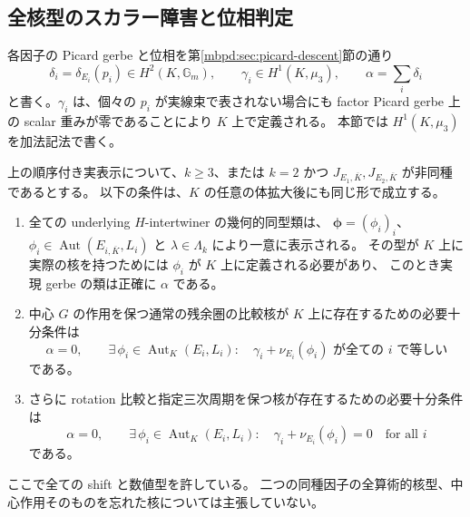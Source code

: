 \subsection{全核型のスカラー障害と位相判定}

各因子の Picard gerbe と位相を第\ref{mbpd:sec:picard-descent}節の通り
\[
 \delta_i=\delta_{E_i}(p_i)\in H^2(K,\mathbb G_m),\qquad
 \gamma_i\in H^1(K,\mu_3),\qquad
 \alpha=\sum_i\delta_i
\]
と書く。$\gamma_i$ は、個々の $p_i$ が実線束で表されない場合にも
factor Picard gerbe 上の scalar 重みが零であることにより $K$ 上で定義される。
本節では $H^1(K,\mu_3)$ を加法記法で書く。

\begin{theorem}[因子分離の下での全中心同変核の存在判定]
\label{mbfc:thm:full-criterion}
上の順序付き実表示について、$k\ge3$、または
$k=2$ かつ $J_{E_1,\overline K},J_{E_2,\overline K}$ が非同種であるとする。
以下の条件は、$K$ の任意の体拡大後にも同じ形で成立する。

\begin{enumerate}
 \item 全ての underlying $H$-intertwiner の幾何的同型類は、
       $\boldsymbol\phi=(\phi_i)_i$、
       $\phi_i\in\operatorname{Aut}(E_{i,\overline K},L_i)$ と
       $\lambda\in\Lambda_k$ により一意に表示される。
       その型が $K$ 上に実際の核を持つためには $\phi_i$ が $K$ 上に定義される必要があり、
       このとき実現 gerbe の類は正確に $\alpha$ である。
 \item 中心 $G$ の作用を保つ通常の残余圏の比較核が $K$ 上に存在するための必要十分条件は
       \begin{equation}\label{mbfc:eq:ordinary-criterion}
        \alpha=0,\qquad
        \exists\,\phi_i\in\operatorname{Aut}_K(E_i,L_i):\quad
        \gamma_i+\nu_{E_i}(\phi_i)
           \text{ が全ての }i\text{ で等しい}
       \end{equation}
       である。
 \item さらに rotation 比較と指定三次周期を保つ核が存在するための必要十分条件は
       \begin{equation}\label{mbfc:eq:strong-criterion}
        \alpha=0,\qquad
        \exists\,\phi_i\in\operatorname{Aut}_K(E_i,L_i):\quad
        \gamma_i+\nu_{E_i}(\phi_i)=0\quad\text{for all }i
       \end{equation}
       である。
\end{enumerate}
ここで全ての shift と数値型を許している。
二つの同種因子の全算術的核型、中心作用そのものを忘れた核については主張していない。
\end{theorem}
